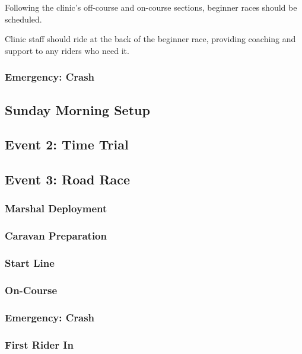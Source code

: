 \documentclass[
  letterpaper, %
  fontsize=10pt, %
  twoside=true,
  chapterentrydots=true, %
  numbers=noenddot,
  fontmethod=tex,
]{kaobook}
\begin{document}
Following the clinic's off-course and on-course sections,
beginner races should be scheduled.


Clinic staff should ride at the back of the beginner race,
providing coaching and support to any riders who need it.


\subsubsection{Emergency: Crash}

\subsection{Sunday Morning Setup}

\subsection{Event 2: Time Trial}

\subsection{Event 3: Road Race}

\subsubsection{Marshal Deployment}

\subsubsection{Caravan Preparation}

\subsubsection{Start Line}

\subsubsection{On-Course}

\subsubsection{Emergency: Crash}

\subsubsection{First Rider In}
\end{document}
